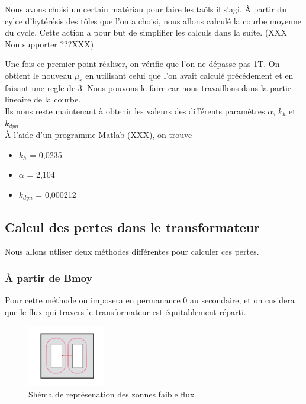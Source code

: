 Nous avons choisi un certain matériau pour faire les taôls il s'agi.
 À partir du cylce d'hytérésis des tôles que l'on a choisi, nous allons calculé la courbe moyenne du cycle. Cette action a pour but de simplifier les calculs dans la suite. (XXX Non supporter ???XXX) 

Une fois ce premier point réaliser, on vérifie que l'on ne dépasse pas 1T. On obtient le nouveau $\mu_r$ en utilisant celui que l'on avait calculé précédement et en faisant une regle de 3. Nous pouvons le faire car nous travaillons dans la partie lineaire de la courbe.\\



Ils nous reste maintenant à obtenir les valeurs des différents paramètres  $\alpha$, $k_h$ et $k_{dyn}$\\

À l'aide d'un programme Matlab (XXX), on trouve 
\begin{itemize}
\item  $k_h$   = 0,0235
\item $\alpha$ = 2,104
\item $k_{dyn}$ = 0,000212
\end{itemize}


\subsection{Calcul des pertes dans le transformateur}

Nous allons utliser deux méthodes différentes pour calculer ces pertes. 

\subsubsection{À partir de Bmoy}

Pour cette méthode on imposera en permanance 0 au secondaire, et on cnsidera que le flux qui travers le transformateur est équitablement réparti. \\

\begin{figure}[ht]
	\begin{center}
	\includegraphics[width=0.3\textwidth]{images/TP3_repartission_Bmoy}
	\caption{Shéma de représenation des zonnes faible flux}\label{img:RepChampsBmoy}
	\end{center}
\end{figure}
\FloatBarrier



